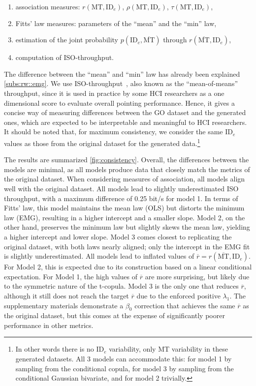 \documentclass[manuscript,review,anonymous]{acmart}
\newcommand{\mmt}{\ensuremath{\overline{\text{MT}}}\xspace}
\newcommand{\ide}{\ensuremath{{\text{ID}_e}}\xspace}
\begin{document}
\begin{enumerate}
	\item association measures: $r(\text{MT}, \ide)$, $\rho(\text{MT}, \ide)$, $\tau(\text{MT}, \ide)$,
	\item Fitts' law measures: parameters of the ``mean'' and the ``min'' law,
	\item estimation of the joint probability $p(\ide, \mmt)$ through $r(\overline{\text{MT}}, \ide)$,
	\item computation of ISO-throughput.
\end{enumerate}
The difference between the ``mean'' and ``min'' law has already been explained \autoref{subs:rw::emg}. We use ISO-throughput~\cite{soukoreff2004}, also known as the ``mean-of-means'' throughput, since it is used in practice by some HCI researchers as a one dimensional score to evaluate overall pointing performance. Hence, it gives a concise way of measuring differences between the GO dataset and the generated ones, which are expected to be interpretable and meaningful to HCI researchers.
It should be noted that, for maximum consistency, we consider the same \ide values as those from the original dataset for the generated data.\footnote{In other words there is no \ide variability, only MT variability in these generated datasets. All 3 models can accommodate this: for model 1 by sampling from the conditional copula, for model 3 by sampling from the conditional Gaussian bivariate, and for model 2 trivially.}



The results are summarized \autoref{fig:consistency}.
Overall, the differences between the models are minimal, as all models produce data that closely match the metrics of the original dataset. When considering measures of association, all models align well with the original dataset.
All models lead to slightly underestimated ISO throughput, with a maximum difference of 0.25 bit/s for model 1.
In terms of Fitts' law, this model maintains the mean law (OLS) but distorts the minimum law (EMG), resulting in a higher intercept and a smaller slope. Model 2, on the other hand, preserves the minimum law but slightly skews the mean law, yielding a higher intercept and lower slope. Model 3 comes closest to replicating the original dataset, with both laws nearly aligned; only the intercept in the EMG fit is slightly underestimated.
All models lead to inflated values of $\overline{r} = r(\mmt, \ide)$. For Model 2, this is expected due to its construction based on a linear conditional expectation. For Model 1, the high values of $\overline{r}$ are more surprising, but likely due to the symmetric nature of the t-copula.
Model 3 is the only one that reduces $\overline{r}$, although it still does not reach the target $\overline{r}$ due to the enforced positive $\lambda_1$. The supplementary materials demonstrate a $\beta_0$ correction that achieves the same $\overline{r}$ as the original dataset, but this comes at the expense of significantly poorer performance in other metrics.
\end{document}
